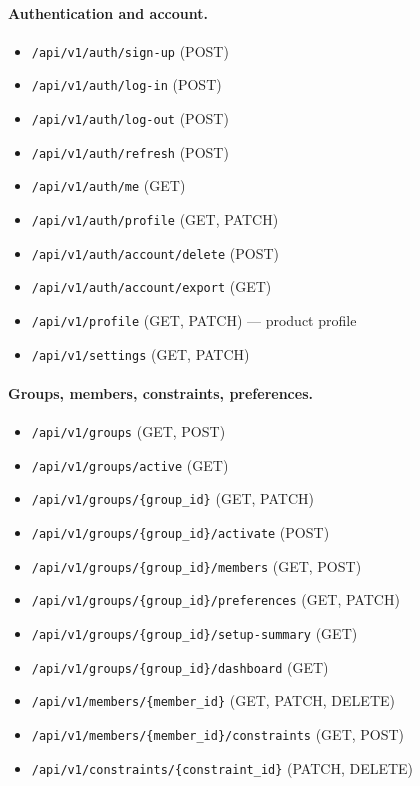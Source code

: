 \paragraph{Authentication and account.}
\begin{itemize}
\item \texttt{/api/v1/auth/sign-up} (POST)
\item \texttt{/api/v1/auth/log-in} (POST)
\item \texttt{/api/v1/auth/log-out} (POST)
\item \texttt{/api/v1/auth/refresh} (POST)
\item \texttt{/api/v1/auth/me} (GET)
\item \texttt{/api/v1/auth/profile} (GET, PATCH)
\item \texttt{/api/v1/auth/account/delete} (POST)
\item \texttt{/api/v1/auth/account/export} (GET)
\item \texttt{/api/v1/profile} (GET, PATCH) --- product profile
\item \texttt{/api/v1/settings} (GET, PATCH)
\end{itemize}

\paragraph{Groups, members, constraints, preferences.}
\begin{itemize}
\item \texttt{/api/v1/groups} (GET, POST)
\item \texttt{/api/v1/groups/active} (GET)
\item \texttt{/api/v1/groups/\{group\_id\}} (GET, PATCH)
\item \texttt{/api/v1/groups/\{group\_id\}/activate} (POST)
\item \texttt{/api/v1/groups/\{group\_id\}/members} (GET, POST)
\item \texttt{/api/v1/groups/\{group\_id\}/preferences} (GET, PATCH)
\item \texttt{/api/v1/groups/\{group\_id\}/setup-summary} (GET)
\item \texttt{/api/v1/groups/\{group\_id\}/dashboard} (GET)
\item \texttt{/api/v1/members/\{member\_id\}} (GET, PATCH, DELETE)
\item \texttt{/api/v1/members/\{member\_id\}/constraints} (GET, POST)
\item \texttt{/api/v1/constraints/\{constraint\_id\}} (PATCH, DELETE)
\end{itemize}

